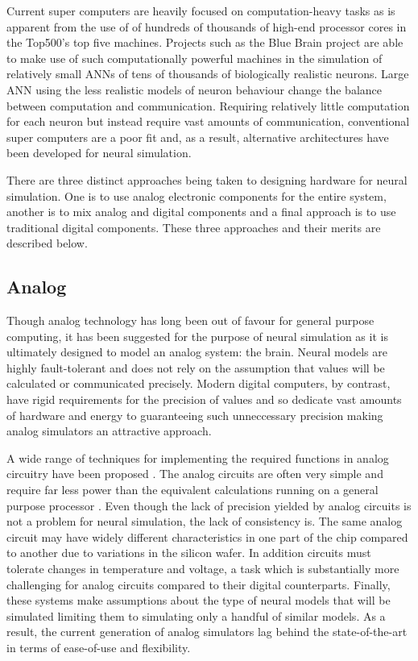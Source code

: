 		Current super computers are heavily focused on computation-heavy tasks as is
		apparent from the use of of hundreds of thousands of high-end processor
		cores in the Top500's top five machines. Projects such as the Blue Brain
		project \cite{markram06} are able to make use of such computationally
		powerful machines in the simulation of relatively small ANNs of tens of
		thousands of biologically realistic neurons. Large ANN using the less
		realistic models of neuron behaviour change the balance between computation
		and communication. Requiring relatively little computation for each neuron
		but instead require vast amounts of communication, conventional super
		computers are a poor fit and, as a result, alternative architectures have
		been developed for neural simulation.
		
		There are three distinct approaches being taken to designing hardware for
		neural simulation. One is to use analog electronic components for the
		entire system, another is to mix analog and digital components and a final
		approach is to use traditional digital components. These three approaches
		and their merits are described below.
		
		\subsection{Analog}
		
			Though analog technology has long been out of favour for general purpose
			computing, it has been suggested for the purpose of neural simulation as
			it is ultimately designed to model an analog system: the brain. Neural
			models are highly fault-tolerant and does not rely on the assumption that
			values will be calculated or communicated precisely. Modern digital
			computers, by contrast, have rigid requirements for the precision of
			values and so dedicate vast amounts of hardware and energy to guaranteeing
			such unneccessary precision making analog simulators an attractive
			approach.
			
			A wide range of techniques for implementing the required functions in
			analog circuitry have been proposed
			\cite{graf86,holler89,agranat90,azghadi13}.  The analog circuits are often
			very simple and require far less power than the equivalent calculations
			running on a general purpose processor \cite{misra10}. Even though the
			lack of precision yielded by analog circuits is not a problem for neural
			simulation, the lack of consistency is. The same analog circuit may have
			widely different characteristics in one part of the chip compared to
			another due to variations in the silicon wafer. In addition circuits must
			tolerate changes in temperature and voltage, a task which is substantially
			more challenging for analog circuits compared to their digital
			counterparts. Finally, these systems make assumptions about the type of
			neural models that will be simulated limiting them to simulating only a
			handful of similar models. As a result, the current generation of analog
			simulators lag behind the state-of-the-art in terms of ease-of-use and
			flexibility.
		

